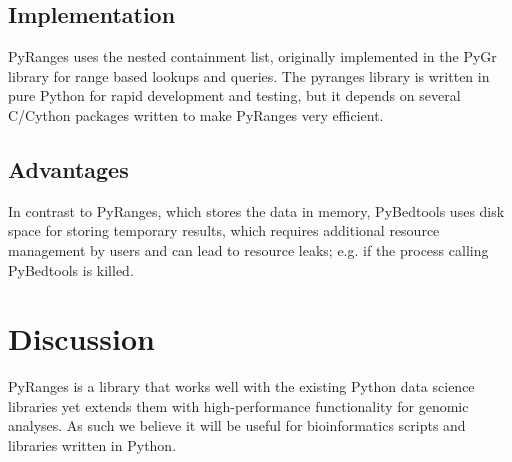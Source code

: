 \documentclass[10pt,letterpaper]{article}
\begin{document}

\subsection*{Implementation}

PyRanges uses the nested containment list, originally implemented in the PyGr
library \cite{doi:10.1093/bioinformatics/btl647} for range based lookups and
queries. The pyranges library is written in pure Python for rapid development
and testing, but it depends on several C/Cython packages written to make
PyRanges very efficient.

\subsection*{Advantages}

In contrast to PyRanges, which stores the data in memory, PyBedtools uses disk
space for storing temporary results, which requires additional resource
management by users and can lead to resource leaks; e.g. if the process calling
PyBedtools is killed.

\section*{Discussion}

PyRanges is a library that works well with the existing Python data science
libraries yet extends them with high-performance functionality for genomic
analyses. As such we believe it will be useful for bioinformatics scripts and
libraries written in Python.




\end{document}
